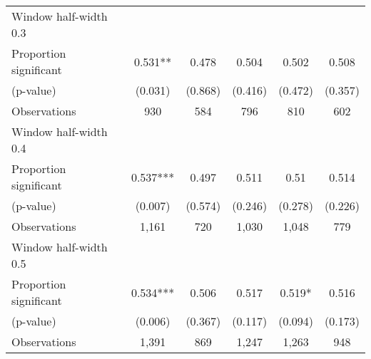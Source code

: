 \begin{tabular}{l*{5}{c}}
\hline
Window half-width 0.3\\

Proportion significant& 0.531** &  0.478 &  0.504 &  0.502 &  0.508\\

(p-value) & (0.031) &  (0.868) &  (0.416) &  (0.472) &  (0.357)\\

Observations& 930 &  584 &  796 &  810 &  602\\

\hline
Window half-width 0.4\\

Proportion significant& 0.537*** &  0.497 &  0.511 &  0.51 &  0.514\\

(p-value) & (0.007) &  (0.574) &  (0.246) &  (0.278) &  (0.226)\\

Observations& 1,161 &  720 &  1,030 &  1,048 &  779\\

\hline
Window half-width 0.5\\

Proportion significant& 0.534*** &  0.506 &  0.517 &  0.519* &  0.516\\

(p-value) & (0.006) &  (0.367) &  (0.117) &  (0.094) &  (0.173)\\

Observations& 1,391 &  869 &  1,247 &  1,263 &  948\\

\hline\hline
\end{tabular}

